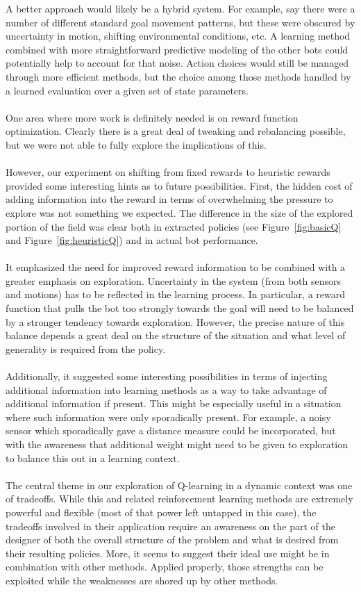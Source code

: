 \documentclass{aiaa-tc}%
\begin{document}
A better approach would likely be a hybrid system. For example, say
there were a number of different standard goal movement patterns, but
these were obscured by uncertainty in motion, shifting environmental
conditions, etc. A learning method combined with more straightforward
predictive modeling of the other bots could potentially help to
account for that noise. Action choices would still be managed through
more efficient methods, but the choice among those methods handled by
a learned evaluation over a given set of state parameters. \\ \\
One area where more work is definitely needed is on reward function
optimization. Clearly there is a great deal of tweaking and rebalancing
possible, but we were not able to fully explore the implications of
this. \\ \\
However, our experiment on shifting from fixed rewards to
heuristic rewards provided some interesting hints as to future possibilities. First, the hidden cost of
adding information into the reward in terms of overwhelming the
pressure to explore was not something we expected. The difference in the size of the explored portion of the field was clear both in extracted policies (see Figure~\ref{fig:basicQ} and Figure~\ref{fig:heuristicQ}) and in actual bot performance. \\ \\
It
emphasized the need for improved reward information to be combined with a greater emphasis
on exploration. Uncertainty in the system (from both sensors and
motions) has to be reflected in the learning process. In particular, a reward function that pulls the bot too strongly towards the goal will need to be balanced by a stronger tendency towards exploration. However, the precise nature of this balance depends a great deal on the structure of the situation and what level of generality is required from the policy. \\ \\ 
Additionally, it
suggested some interesting possibilities in terms of injecting
additional information into learning methods as a way to take
advantage of additional information if present. This might be
especially useful in a situation where such information were only
sporadically present. For example, a noisy sensor which sporadically
gave a distance measure could be incorporated, but with the awareness
that additional weight might need to be given to exploration to
balance this out in a learning context. \\ \\
The central theme in our exploration of Q-learning in a dynamic
context was one of tradeoffs. While this and related reinforcement
learning methods are extremely powerful and flexible (most of that power
left untapped in this case), the tradeoffs involved in their application require an awareness on the part of the designer of both the overall structure of the problem and what is desired from their resulting policies. More, it 
seems to suggest their ideal use might be in combination with other
methods. Applied properly, those strengths can be exploited while the weaknesses
are shored up by other methods.
\end{document}
